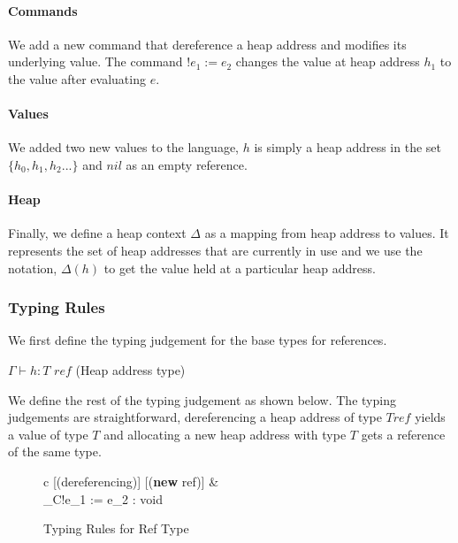 \documentclass[a4paper,12pt]{report}
\begin{document}
\paragraph{Commands}
We add a new command that dereference a heap address and modifies its underlying 
value. The command $!e_1 := e_2$ changes the value at heap address $h_1$ to the 
value after evaluating $e$.

\paragraph{Values}
We added two new values to the language, $h$ is simply a heap address in the set 
$\{h_0, h_1, h_2...\}$ and $nil$ as an empty reference. 

\paragraph{Heap}
Finally, we define a heap context $\Delta$ as a mapping from heap address to values.  
It represents the set of heap addresses that are currently in use and we use 
the notation, $\Delta(h)$ to get the value held at a particular heap address. 

\subsubsection{Typing Rules}
We first define the typing judgement for the base types for references. 

\begin{center}
   $\Gamma \vdash h : T\textit{ ref}$ (Heap address type)
\end{center}

\par
We define the rest of the typing judgement as shown below. 
The typing judgements are straightforward, 
dereferencing a heap address of type $T \textit{ref}$ yields a value of type $T$ and 
allocating a new heap address with type $T$ gets a reference of the same type.

\begin{figure}[H]
  \begin{center}
    \begin{tabular} {c}
      [(dereferencing)]
      \text{ }
      [(\textbf{new} ref)]
      & \\
       {\Gamma \vdash_{C}\text{ }!e_1 := e_2 : void}
    \end{tabular}
  \end{center}
  \caption{Typing Rules for Ref Type}
\end{figure}
\end{document}
